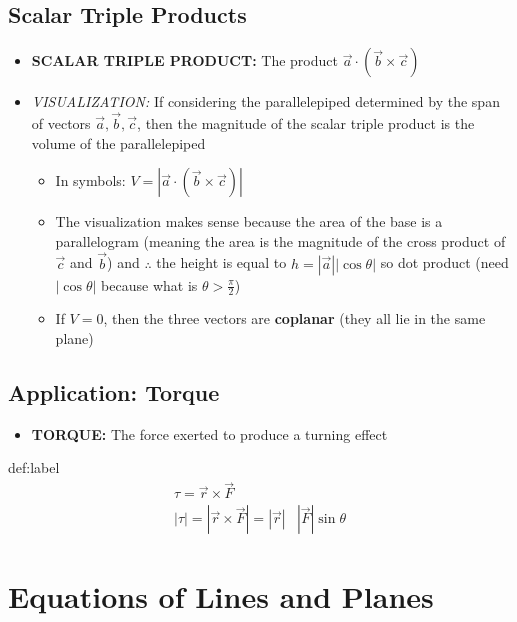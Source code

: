 \documentclass{package/notes}
\begin{document}
\subsection{Scalar Triple Products}

\begin{itemize}
	\item \textbf{SCALAR TRIPLE PRODUCT:} The product $\vec a \cdot (\vec b \times \vec c)$ 
	\item \textit{VISUALIZATION:} If considering the parallelepiped determined by the span of vectors $\vec a, \vec b, \vec c$, then the magnitude of the scalar triple product is the volume of the parallelepiped
	\begin{itemize}
		\item In symbols: $V = |\vec a \cdot (\vec b \times \vec c)|$
		\item The visualization makes sense because the area of the base is a parallelogram (meaning the area is the magnitude of the cross product of $\vec c$ and $\vec b$) and $\therefore$ the height is equal to $h = |\vec a| |\cos \theta|$ so dot product (need $|\cos\theta|$ because what is $\theta>\frac{\pi}{2}$)
		\item If $ V = 0$, then the three vectors are \textbf{coplanar} (they all lie in the same plane)
	\end{itemize}
\end{itemize}

\subsection{Application: Torque}

\begin{itemize}
	\item \textbf{TORQUE:} The force exerted to produce a turning effect
\end{itemize}

\begin{definition}[Torque]{def:label}
	$$
	\begin{aligned}
		\tau = \vec r \times \vec F&\\
		|\tau| = |\vec r \times \vec F| = |\vec r|&|\vec F|\sin\theta
	\end{aligned}
	$$
\end{definition}


\section{Equations of Lines and Planes}
\end{document}
